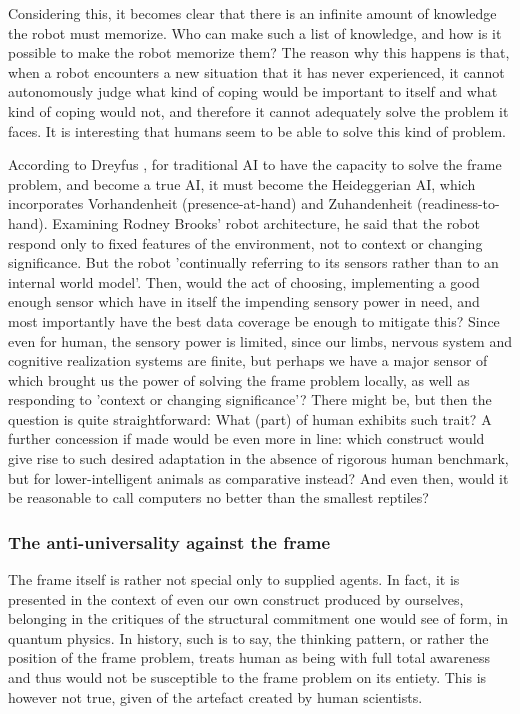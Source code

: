 Considering this, it becomes clear that there is an infinite amount of knowledge the robot must memorize. Who can make such a list of knowledge, and how is it possible to make the robot memorize them? The reason why this happens is that, when a robot encounters a new situation that it has never experienced, it cannot autonomously judge what kind of coping would be important to itself and what kind of coping would not, and therefore it cannot adequately solve the problem it faces. It is interesting that humans seem to be able to solve this kind of problem.

According to Dreyfus \cite{DreyfusImpasse1979}, for traditional AI to have the capacity to solve the frame problem, and become a true AI, it must become the Heideggerian AI, which incorporates Vorhandenheit (presence-at-hand) and Zuhandenheit (readiness-to-hand). Examining Rodney Brooks' robot architecture, he said that the robot respond only to fixed features of the environment, not to context or changing significance. But the robot 'continually referring to its sensors rather than to an internal world model'. Then, would the act of choosing, implementing a good enough sensor which have in itself the impending sensory power in need, and most importantly have the best data coverage be enough to mitigate this? Since even for human, the sensory power is limited, since our limbs, nervous system and cognitive realization systems are finite, but perhaps we have a major sensor of which brought us the power of solving the frame problem locally, as well as responding to 'context or changing significance'? There might be, but then the question is quite straightforward: What (part) of human exhibits such trait? A further concession if made would be even more in line: which construct would give rise to such desired adaptation in the absence of rigorous human benchmark, but for lower-intelligent animals as comparative instead? And even then, would it be reasonable to call computers no better than the smallest reptiles?

\subsubsection{The anti-universality against the frame}

The frame itself is rather not special only to supplied agents. In fact, it is presented in the context of even our own construct produced by ourselves, belonging in the critiques of the structural commitment one would see of form, in quantum physics. In history, such is to say, the thinking pattern, or rather the position of the frame problem, treats human as being with full total awareness and thus would not be susceptible to the frame problem on its entiety. This is however not true, given of the artefact created by human scientists. 

